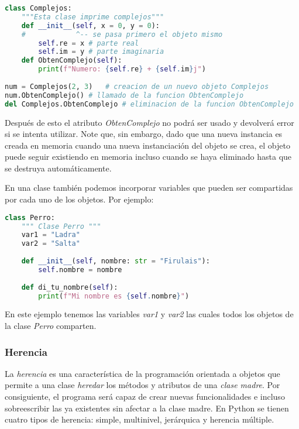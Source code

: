 	\begin{lstlisting}[language = {python}]
class Complejos:
    """Esta clase imprime complejos"""
    def __init__(self, x = 0, y = 0):   
    #            ^-- se pasa primero el objeto mismo
        self.re = x # parte real
        self.im = y # parte imaginaria
    def ObtenComplejo(self):
        print(f"Numero: {self.re} + {self.im}j")
    
num = Complejos(2, 3)   # creacion de un nuevo objeto Complejos
num.ObtenComplejo() # llamado de la funcion ObtenComplejo
del Complejos.ObtenComplejo # eliminacion de la funcion ObtenComplejo
	\end{lstlisting}
	Después de esto el atributo \emph{ObtenComplejo} no podrá ser usado y devolverá error si se intenta utilizar. Note que, sin embargo, dado que una nueva instancia es creada en memoria cuando una nueva instanciación del objeto se crea, el objeto puede seguir existiendo en memoria incluso cuando se haya eliminado hasta que se destruya automáticamente.\par 
	En una clase también podemos incorporar variables que pueden ser compartidas por cada uno de los objetos. Por ejemplo:
    \begin{lstlisting}[language = {python}]
class Perro:
    """ Clase Perro """
    var1 = "Ladra"
    var2 = "Salta"
    
    def __init__(self, nombre: str = "Firulais"):
        self.nombre = nombre
        
    def di_tu_nombre(self):
        print(f"Mi nombre es {self.nombre}")
    \end{lstlisting}
    En este ejemplo tenemos las variables \emph{var1} y \emph{var2} las cuales todos los objetos de la clase \emph{Perro} comparten.
    \subsubsection{Herencia}
    La \emph{herencia} es una característica de la programación orientada a objetos que permite a una clase \emph{heredar} los métodos y atributos de una \emph{clase madre}. Por consiguiente, el programa será capaz de crear nuevas funcionalidades e incluso sobreescribir las ya existentes sin afectar a la clase madre. En Python se tienen cuatro tipos de herencia: simple, multinivel, jerárquica y herencia múltiple.
